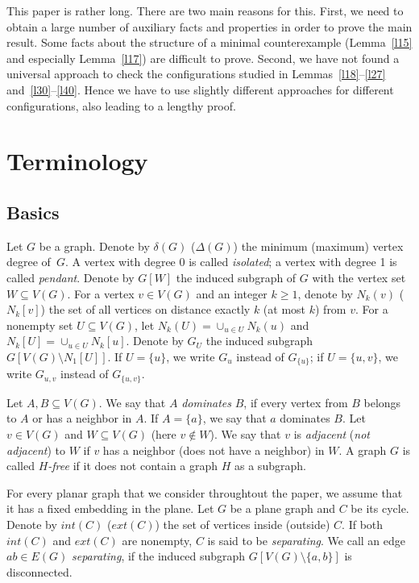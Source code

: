 \documentclass[12pt]{article}
\begin{document}
This paper is rather long. There are two main reasons for this. First, we need to obtain a large number of auxiliary facts and properties in order to prove the main result. Some facts about the structure of a minimal counterexample (Lemma~\ref{l15} and especially Lemma~\ref{l17}) are difficult to prove. Second, we have not found a universal approach to check the configurations studied in Lemmas~\ref{l18}--\ref{l27} and~\ref{l30}--\ref{l40}. Hence we have to use slightly different approaches for different configurations, also leading to a lengthy proof.

\section{Terminology}

\subsection{Basics}

Let $G$ be a graph. Denote by $\delta(G)$ ($\Delta(G)$) the minimum (maximum) vertex degree of~$G$. A vertex with degree 0 is called \textit{isolated}; a vertex with degree 1 is called \textit{pendant}. Denote by $G[W]$ the induced subgraph of $G$ with the vertex set $W \subseteq V(G)$. For a vertex $v \in V(G)$ and an integer $k \geq 1$, denote by $N_k(v)$ ($N_k[v]$) the set of all vertices on distance exactly $k$ (at most $k$) from $v$. For a nonempty set $U \subseteq V(G)$, let $N_k(U) = \cup_{u \in U}N_k(u)$ and $N_k[U] = \cup_{u \in U}N_k[u]$. Denote by $G_U$ the induced subgraph $G[V(G) \setminus N_1[U]]$. If $U = \{u\}$, we write $G_u$ instead of $G_{\{u\}}$; if $U = \{u,v\}$, we write $G_{u,v}$ instead of $G_{\{u,v\}}$. 

Let $A,B \subseteq V(G)$. We say that $A$ \textit{dominates} $B$, if every vertex from $B$ belongs to $A$ or has a neighbor in $A$. If $A = \{a\}$, we say that $a$ dominates $B$. Let $v \in V(G)$ and $W \subseteq V(G)$ (here $v \notin W$). We say that $v$ is \textit{adjacent} (\textit{not adjacent}) to $W$ if $v$ has a neighbor (does not have a neighbor) in $W$.  A graph $G$ is called \textit{$H$-free} if it does not contain a graph $H$ as a subgraph.

For every planar graph that we consider throughtout the paper, we assume that it has a fixed embedding in the plane. Let $G$ be a plane graph and $C$ be its cycle. Denote by $int(C)$ ($ext(C)$) the set of vertices inside (outside) $C$. If both $int(C)$ and $ext(C)$ are nonempty, $C$ is said to be \textit{separating}. We call an edge $ab \in E(G)$ \textit{separating}, if the induced subgraph $G[V(G) \setminus \{a,b\}]$ is disconnected. 
\end{document}
